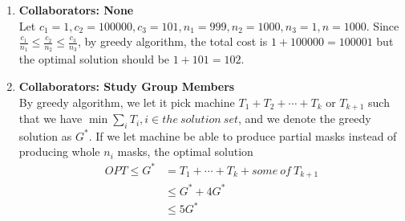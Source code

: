 \documentclass[a4paper,12pt]{article}
\begin{document}
\begin{enumerate}
{\begin{enumerate}
    \item {\textbf{Collaborators: None} \\ 
Let $c_1 = 1, c_2 = 100000, c_3 = 101, n_1 = 999, n_2 = 1000, n_3 = 1, n = 1000$. Since $\frac{c_1}{n_1}\leq \frac{c_2}{n_2} \leq \frac{c_3}{n_3}$, by greedy algorithm, the total cost is $1+100000=100001$ but the optimal solution should be $1+101 = 102$.
}
    \item{ \textbf{Collaborators: Study Group Members} \\
By greedy algorithm, we let it pick machine $T_1 + T_2 + \cdots + T_k$ or $T_{k+1}$ such that we have $\min \sum _i T_i, i \in the \ solution \ set$, and we denote the greedy solution as $G^*$. If we let machine be able to produce partial masks instead of producing whole $n_i$ masks, the optimal solution
\[
\begin{split}
    OPT \leq G^* & = T_1 + \cdots + T_k + some \ of \ T_{k+1} \\
    & \leq G^* + 4G^* \\
    & \leq 5G^*
\end{split}
\]
}
\end{enumerate}

}


\end{enumerate}
\end{document}
